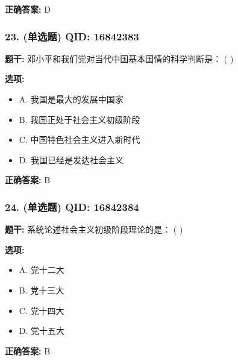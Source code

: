 \documentclass[12pt,UTF8]{ctexart}
\begin{document}
\textbf{正确答案:}
D

\vspace{0.3em}\hrulefill\vspace{0.7em}

\subsubsection*{23. (单选题) \small QID: 16842383}

\textbf{题干:}
邓小平和我们党对当代中国基本国情的科学判断是： ( )

\textbf{选项:}
\begin{itemize}[leftmargin=*]

  \item A. 我国是最大的发展中国家

  \item B. 我国正处于社会主义初级阶段

  \item C. 中国特色社会主义进入新时代

  \item D. 我国已经是发达社会主义

\end{itemize}

\textbf{正确答案:}
B

\vspace{0.3em}\hrulefill\vspace{0.7em}

\subsubsection*{24. (单选题) \small QID: 16842384}

\textbf{题干:}
系统论述社会主义初级阶段理论的是： ( )

\textbf{选项:}
\begin{itemize}[leftmargin=*]

  \item A. 党十二大

  \item B. 党十三大

  \item C. 党十四大

  \item D. 党十五大

\end{itemize}

\textbf{正确答案:}
B

\vspace{0.3em}\hrulefill\vspace{0.7em}
\end{document}
